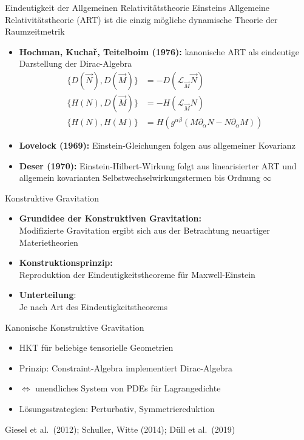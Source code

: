 \documentclass{beamer}
\begin{document}
    \begin{frame}{Eindeutigkeit der Allgemeinen Relativitätstheorie}
        Einsteins Allgemeine Relativitätstheorie (ART) ist die einzig mögliche dynamische Theorie
        der Raumzeitmetrik \pause
        \begin{itemize}
            \setlength{\belowdisplayskip}{-10pt}
            \item \textbf{Hochman, Kuchař, Teitelboim (1976):} kanonische ART
            als eindeutige Darstellung der Dirac-Algebra
            \begin{align*}
                \{ D(\vec N), D(\vec M) \} &= -D(\mathcal L_{\vec M} \vec N) \\
                \{ H(N), D(\vec M) \} &= -H(\mathcal L_{\vec M} N) \\
                \{ H(N), H(M) \} &= H(g^{\alpha\beta}(M\partial_\alpha N - N\partial_\alpha M))
            \end{align*} \pause
            \item \textbf{Lovelock (1969):} Einstein-Gleichungen folgen aus allgemeiner Kovarianz \pause
            \item \textbf{Deser (1970):} Einstein-Hilbert-Wirkung folgt aus linearisierter ART und allgemein kovarianten
            Selbstwechselwirkungstermen bis Ordnung $\infty$
        \end{itemize}
    \end{frame}

    \begin{frame}{Konstruktive Gravitation}
        \begin{itemize}
            \item \textbf{Grundidee der Konstruktiven Gravitation:} \\
            Modifizierte Gravitation ergibt sich aus der Betrachtung neuartiger Materietheorien
            \item \textbf{Konstruktionsprinzip:} \\
            Reproduktion der Eindeutigkeitstheoreme für Maxwell-Einstein
            \item \textbf{Unterteilung}: \\
            Je nach Art des Eindeutigkeitstheorems
        \end{itemize}
    \end{frame}

    \begin{frame}{Kanonische Konstruktive Gravitation}
        \begin{itemize}
            \item HKT für beliebige tensorielle Geometrien
            \item Prinzip: Constraint-Algebra implementiert Dirac-Algebra
            \item $\Leftrightarrow$ unendliches System von PDEs für Lagrangedichte
            \item Lösungsstrategien: Perturbativ, Symmetriereduktion
        \end{itemize}

        \raggedleft\scriptsize \lbrack Giesel et al.\ (2012); Schuller, Witte (2014); Düll et al.\ (2019) \rbrack
    \end{frame}
\end{document}
